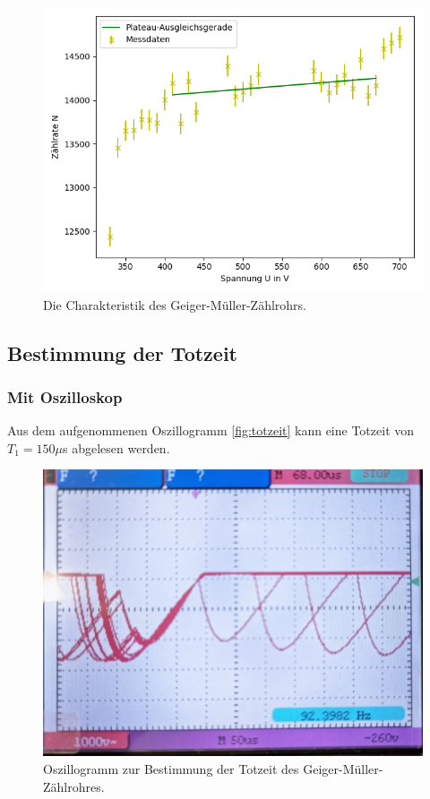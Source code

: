\begin{figure}[H]
  \centering
  \includegraphics{content/figure_1_1.png}
  \caption{Die Charakteristik des Geiger-Müller-Zählrohrs.}
  \label{fig:charakteristik}
\end{figure}


\subsection{Bestimmung der Totzeit}
\subsubsection{Mit Oszilloskop}
Aus dem aufgenommenen Oszillogramm \autoref{fig:totzeit} kann eine Totzeit von 
$T_1 = 150 \mu$s abgelesen werden.\\
\begin{figure}[H]
  \centering
  \includegraphics[width = \textwidth]{content/totzeit.jpg}
  \caption{Oszillogramm zur Bestimmung der Totzeit des Geiger-Müller-Zählrohres.}
  \label{fig:totzeit}
\end{figure}

